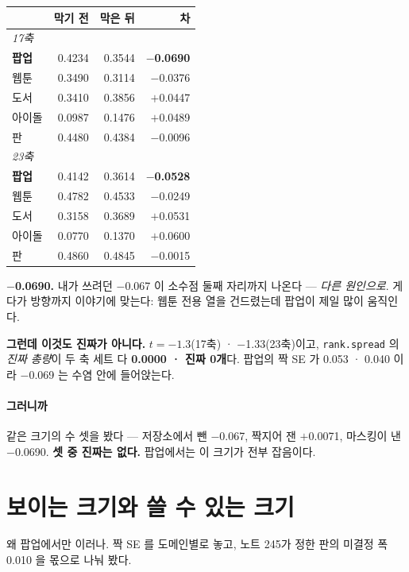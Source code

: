 \documentclass[10pt]{article}
\begin{document}
\begin{center}\small
\begin{tabular}{lrrr}
\hline
& 막기 전 & 막은 뒤 & 차 \\
\hline
\multicolumn{4}{l}{\emph{17축}} \\
\textbf{팝업} & 0.4234 & 0.3544 & \textbf{$-$0.0690} \\
웹툰 & 0.3490 & 0.3114 & $-$0.0376 \\
도서 & 0.3410 & 0.3856 & $+$0.0447 \\
아이돌 & 0.0987 & 0.1476 & $+$0.0489 \\
판 & 0.4480 & 0.4384 & $-$0.0096 \\
\hline
\multicolumn{4}{l}{\emph{23축}} \\
\textbf{팝업} & 0.4142 & 0.3614 & \textbf{$-$0.0528} \\
웹툰 & 0.4782 & 0.4533 & $-$0.0249 \\
도서 & 0.3158 & 0.3689 & $+$0.0531 \\
아이돌 & 0.0770 & 0.1370 & $+$0.0600 \\
판 & 0.4860 & 0.4845 & $-$0.0015 \\
\hline
\end{tabular}
\end{center}

\textbf{$-$0.0690.} 내가 쓰려던 $-$0.067 이 소수점 둘째 자리까지 나온다 ---
\emph{다른 원인으로}. 게다가 방향까지 이야기에 맞는다: 웹툰 전용 열을
건드렸는데 팝업이 제일 많이 움직인다.

\textbf{그런데 이것도 진짜가 아니다.} $t{=}{-}1.3$(17축) ·
$-$1.33(23축)이고, \texttt{rank.spread} 의 \emph{진짜 총량}이 두 축 세트 다
\textbf{0.0000 · 진짜 0개}다. 팝업의 짝 SE 가 0.053 · 0.040 이라 $-$0.069
는 수염 안에 들어앉는다.

\paragraph{그러니까} 같은 크기의 수 셋을 봤다 --- 저장소에서 뺀
$-$0.067, 짝지어 잰 $+$0.0071, 마스킹이 낸 $-$0.0690. \textbf{셋 중 진짜는
없다.} 팝업에서는 이 크기가 전부 잡음이다.

\section{보이는 크기와 쓸 수 있는 크기}

왜 팝업에서만 이러나. 짝 SE 를 도메인별로 놓고, 노트 245가 정한 판의
미결정 폭 0.010 을 몫으로 나눠 봤다.
\end{document}
